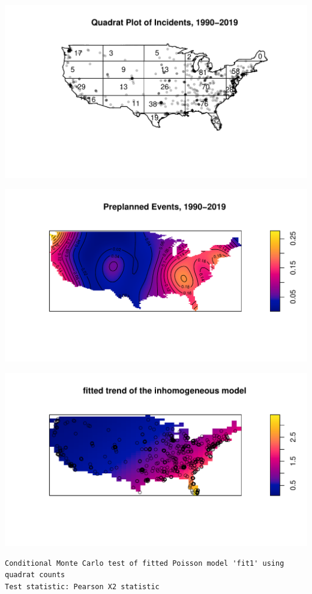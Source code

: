 \documentclass[
  12pt,
]{article}
\begin{document}
\includegraphics{JStevenRaquel_STATS295_Final_files/figure-latex/plot-quadrats-1990-2019-1.pdf}

\includegraphics{JStevenRaquel_STATS295_Final_files/figure-latex/heatmap-preplanned-1.pdf}

\includegraphics{JStevenRaquel_STATS295_Final_files/figure-latex/plot-fit1-inhomogeneous-1.pdf}

\begin{verbatim}
Conditional Monte Carlo test of fitted Poisson model 'fit1' using
quadrat counts
Test statistic: Pearson X2 statistic
\end{verbatim}
\end{document}
